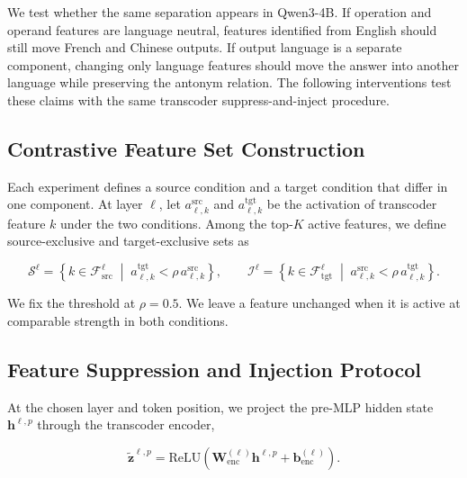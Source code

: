 We test whether the same separation appears in Qwen3-4B.  If operation and
operand features are language neutral, features identified from English should
still move French and Chinese outputs.  If output language is a separate
component, changing only language features should move the answer into another
language while preserving the antonym relation.  The following interventions
test these claims with the same transcoder suppress-and-inject procedure.

\subsection{Contrastive Feature Set Construction}
\label{subsec:exclusive-features}

Each experiment defines a source condition and a target condition that differ
in one component.  At layer $\ell$, let $a_{\ell,k}^{\mathrm{src}}$ and
$a_{\ell,k}^{\mathrm{tgt}}$ be the activation of transcoder feature $k$ under
the two conditions.  Among the top-$K$ active features, we define
source-exclusive and target-exclusive sets as

\begin{equation}
  \mathcal{S}^\ell
    = \left\{k \in \mathcal{F}_{\mathrm{src}}^\ell
        \;\middle|\; a_{\ell,k}^{\mathrm{tgt}} < \rho\,a_{\ell,k}^{\mathrm{src}}\right\},
  \qquad
  \mathcal{I}^\ell
    = \left\{k \in \mathcal{F}_{\mathrm{tgt}}^\ell
        \;\middle|\; a_{\ell,k}^{\mathrm{src}} < \rho\,a_{\ell,k}^{\mathrm{tgt}}\right\}.
  \label{eq:exclusive-sets}
\end{equation}

We fix the threshold at $\rho=0.5$.  We leave a feature unchanged when it is
active at comparable strength in both conditions.

\subsection{Feature Suppression and Injection Protocol}
\label{subsec:multilingual-intervention}

At the chosen layer and token position, we project the pre-MLP hidden state
$\mathbf{h}^{\ell,p}$ through the transcoder encoder,

\begin{equation}
  \tilde{\mathbf{z}}^{\ell,p}
    = \mathrm{ReLU}\!\left(
        \mathbf{W}_{\mathrm{enc}}^{(\ell)}\mathbf{h}^{\ell,p}
        + \mathbf{b}_{\mathrm{enc}}^{(\ell)}
      \right).
  \label{eq:reenc}
\end{equation}

